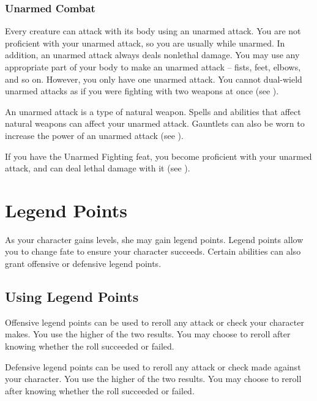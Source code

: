         \subsubsection{Unarmed Combat}\label{Unarmed Combat}
            Every creature can attack with its body using an unarmed attack.
            You are not proficient with your unarmed attack, so you are usually  while unarmed.
            In addition, an unarmed attack always deals nonlethal damage.
            You may use any appropriate part of your body to make an unarmed attack -- fists, feet, elbows, and so on.
            However, you only have one unarmed attack.
            You cannot dual-wield unarmed attacks as if you were fighting with two weapons at once (see ).

            An unarmed attack is a type of natural weapon.
            Spells and abilities that affect natural weapons can affect your unarmed attack.
            Gauntlets can also be worn to increase the power of an unarmed attack (see ).

            If you have the Unarmed Fighting feat, you become proficient with your unarmed attack, and can deal lethal damage with it (see ).

\section{Legend Points}\label{Legend Points}

    As your character gains levels, she may gain legend points.
    Legend points allow you to change fate to ensure your character succeeds.
    Certain abilities can also grant offensive or defensive legend points.

    \subsection{Using Legend Points}

        Offensive legend points can be used to reroll any attack or check your character makes.
        You use the higher of the two results.
        You may choose to reroll after knowing whether the roll succeeded or failed.

        Defensive legend points can be used to reroll any attack or check made against your character.
        You use the higher of the two results.
        You may choose to reroll after knowing whether the roll succeeded or failed.

